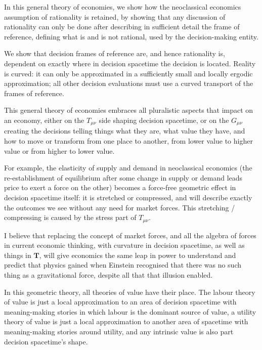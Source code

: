 In this general theory of economies, we show how the neoclassical economics assumption of rationality is retained, by showing that any discussion of rationality  can only be done after describing in sufficient detail the frame of reference, defining what is and is not rational, used by the decision\hyp{}making entity. 


We show that decision frames of reference are, and hence rationality is, dependent on exactly where in decision spacetime the decision is located. Reality is curved: it can only be approximated in a sufficiently small and locally ergodic approximation; all other decision evaluations must use a curved transport of the frames of reference.


This general theory of economies embraces all pluralistic aspects that impact on an economy, either on the $T_{\mu\nu}$ side shaping decision spacetime, or on the $G_{\mu\nu}$ creating the decisions telling things what they are, what value they have, and how to move or transform from one place to another, from lower value to higher value or from higher to lower value.


For example, the elasticity of supply and demand in neoclassical economics (the re\hyp{}establishment of equilibrium after some change in supply or demand leads price to exert a force on the other) becomes a force\hyp{}free geometric effect in decision spacetime itself: it is stretched or compressed, and will describe exactly the outcomes we see without any need for market forces. This stretching / compressing is caused by the stress part of $T_{\mu\nu}$.


I believe that replacing the concept of market forces, and all the algebra of forces in current economic thinking, with curvature in decision spacetime, as well as things in $\mathbf{T}$, will give economics the same leap in power to understand and predict that physics gained when Einstein recognised that there was no such thing as a gravitational force, despite all that that illusion enabled. 


In this geometric theory, all theories of value have their place. The labour theory of value is just a local approximation to an area of decision spacetime with meaning\hyp{}making stories in which labour is the dominant source of value, a utility theory of value is just a local approximation to another area of spacetime with meaning\hyp{}making stories around utility, and any intrinsic value is also part decision spacetime’s shape.


